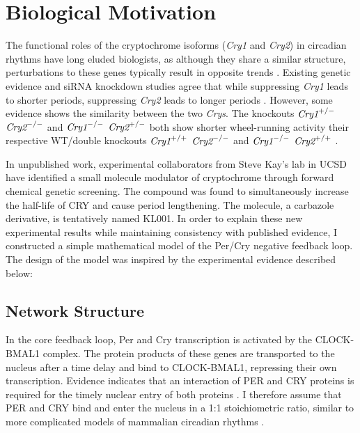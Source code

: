 \section{Biological Motivation}
The functional roles of the cryptochrome isoforms ({\it Cry1} and {\it Cry2}) in circadian rhythms have long eluded biologists, as although they share a similar structure, perturbations to these genes typically result in opposite trends \cite{McCarthy2009}. Existing genetic evidence and siRNA knockdown studies agree that while suppressing {\it Cry1} leads to shorter periods, suppressing {\it Cry2} leads to longer periods \cite{VanderHorst1999,Zhang2009}. However, some evidence shows the similarity between the two {\it Crys}. The knockouts $\text{\it Cry1}^{+/-}$ $\text{\it Cry2}^{-/-}$ and $\text{\it Cry1}^{-/-}$ $\text{\it Cry2}^{+/-}$ both show shorter wheel-running activity their respective WT/double knockouts $\text{\it Cry1}^{+/+}$ $\text{\it Cry2}^{-/-}$ and $\text{\it Cry1}^{-/-}$ $\text{\it Cry2}^{+/+}$ \cite{VanderHorst1999}.

In unpublished work, experimental collaborators from Steve Kay's lab in UCSD have identified a small molecule modulator of cryptochrome through forward chemical genetic screening. The compound was found to simultaneously increase the half-life of CRY and cause period lengthening. The molecule, a carbazole derivative, is tentatively named KL001. In order to explain these new experimental results while maintaining consistency with published evidence, I constructed a simple mathematical model of the Per/Cry negative feedback loop. The design of the model was inspired by the experimental evidence described below:

\subsection{Network Structure} In the core feedback loop, Per and Cry transcription is activated by the CLOCK-BMAL1 complex. The protein products of these genes are transported to the nucleus after a time delay and bind to CLOCK-BMAL1, repressing their own transcription. Evidence indicates that an interaction of PER and CRY proteins is required for the timely nuclear entry of both proteins \cite{Miyazaki2001,Ko2006,Kume1999}. I therefore assume that PER and CRY bind and enter the nucleus in a 1:1 stoichiometric ratio, similar to more complicated models of mammalian circadian rhythms \cite{Leloup2003,Mirsky2009,Forger2003}.

